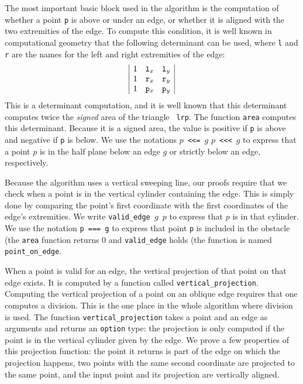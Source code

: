 \documentclass[a4paper, USenglish, cleveref, autoref, thm-restate]{lipics-v2021}
\begin{document}
The most important basic block used in the algorithm is the
computation of whether a point {\tt p} is above or under an edge, or whether
it is aligned with the two extremities of the edge.  To compute this
condition, it is well known in computational geometry \cite{Knuth} that the
following determinant can be used, where {\tt l} and {\tt r} are the
names for the left and right extremities of the edge:
\[\begin{array}{|ccc|}
1 & {\tt l}_x & {\tt l}_y\\
1 & {\tt r}_x & {\tt r}_y\\
1 & {\tt p}_x & {\tt p}_y\\
\end{array}\]
This is a determinant computation, and it is well known that this
determinant computes twice the {\em signed} area of the triangle {\tt
  lrp}.  The function {\tt area} computes this determinant.
Because it is a signed area, the value is positive if {\tt p}
is above and negative if {\tt p} is below.  We use the notations
{\tt \(p\) <<= \(g\)} {\tt \(p\) <<< \(g\)} to express that a point
\(p\) is in the half plane below an edge \(g\) or strictly below an
edge, respectively.

Because the algorithm uses a vertical sweeping line, our proofs
require that we check when a point is in the vertical cylinder
containing the edge.  This is simply done by comparing the point's
first coordinate with the first coordinates of the edge's extremities.
We write {\tt valid\_edge \(g\) \(p\)} to express that \(p\) is in
that cylinder.  We use the notation {\tt p === g} to express that
point {\tt p} is included in the obstacle (the {\tt area} function
returns 0 and {\tt valid\_edge} holds (the function is named
{\tt point\_on\_edge}.

When a point is valid for an edge, the vertical projection of that
point on that edge exists.  It is computed by a function called
{\tt vertical\_projection}.  Computing the vertical projection of a
point on an oblique edge requires that one computes a division.  This
is the one place in the whole algorithm where division is used.
The function {\tt vertical\_projection} takes a point and an edge as
arguments and returns an {\tt option} type:
the projection is only computed if the point is in the vertical
cylinder given by the edge.  We prove a few properties of this
projection function: the point it returns is part of the edge on which
the projection happens, two points with the same second coordinate are
projected to the same point, and the input point and its projection
are vertically aligned.
\end{document}
